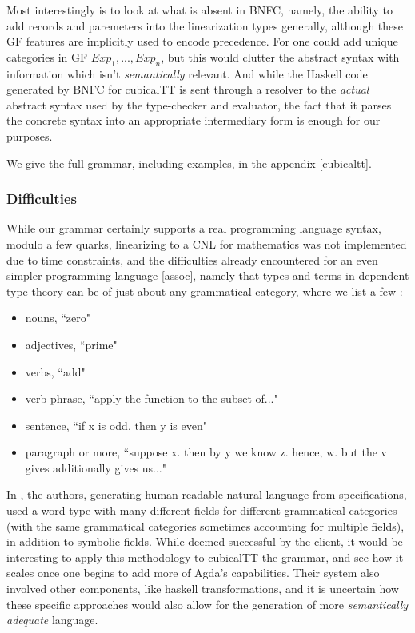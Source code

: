 Most interestingly is to look at what is absent in BNFC, namely, the ability to
add records and paremeters into the linearization types generally, although
these GF features are implicitly used to encode precedence. For one could add
unique categories in GF $Exp_1,...,Exp_n$, but this would clutter the abstract
syntax with information which isn't \emph{semantically} relevant. And while the
Haskell code generated by BNFC for cubicalTT is sent through a resolver to the
\emph{actual} abstract syntax used by the type-checker and evaluator, the fact
that it parses the concrete syntax into an appropriate intermediary form is
enough for our purposes.

We give the full grammar, including examples, in the appendix \ref{cubicaltt}.

\subsubsection{Difficulties}

While our grammar certainly supports a real programming language syntax, modulo
a few quarks, linearizing to a CNL for mathematics was not implemented due to
time constraints, and the difficulties already encountered for an even simpler
programming language \ref{assoc}, namely that types and terms in dependent type
theory can be of just about any grammatical category, where we list a few :

\begin{itemize}
\item nouns, ``zero"
\item adjectives, ``prime"
\item verbs, ``add"
\item verb phrase, ``apply the function to the subset of..."
\item sentence, ``if x is odd, then y is even"
\item paragraph or more, ``suppose x. then by y we know z. hence, w. but the v
  gives additionally gives us..."
\end{itemize}

In \cite{rantaZ}, the authors, generating human readable natural language from
specifications, used a word type with many different fields for different
grammatical categories (with the same grammatical categories sometimes
accounting for multiple fields), in addition to symbolic fields. While deemed
successful by the client, it would be interesting to apply this methodology to 
cubicalTT the grammar, and see how it scales once one begins to add more
of Agda's capabilities. Their system also involved other components, like
haskell transformations, and it is uncertain how these specific approaches would
also allow for the generation of more \emph{semantically adequate} language.

